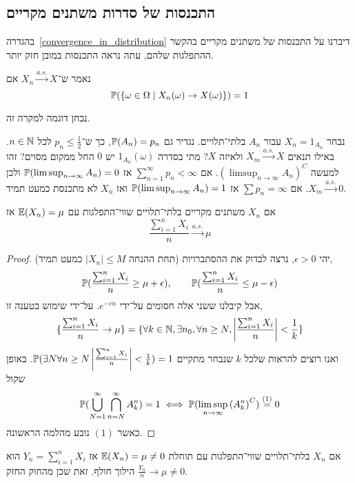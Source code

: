 \subsection{התכנסות של סדרות משתנים מקריים}\label{almost_surely_convergence}
בהגדרה\ \ref{convergence_in_distribution} דיברנו על התכנסות של משתנים מקריים בהקשר ההתפלגות שלהם, עתה נראה התכנסות במובן חזק יותר.
\begin{definition}
	נאמר ש־$X_n \xrightarrow{a.s.} X$ אם
	\[
		\mathbb{P}(\{ \omega \in \Omega \mid X_n(\omega) \to X(\omega) \}) = 1
	\]
\end{definition}
נבחן דוגמה למקרה זה.
\begin{example}
	נבחר $X_n = 1_{A_n}$ עבור $A_n$ בלתי־תלויים.
	נגדיר גם $\mathbb{P}(A_n) = p_n$, כך ש־$p_n \le \frac{1}{2}$ לכל $n \in \mathbb{N}$.
	באילו תנאים $X_m \xrightarrow{a.s.} X$ ולאיזה $X$?
	מתי בסדרה $1_{A_n}(\omega)$ יש $0$ החל ממקום מסוים?
	זהו למעשה ${(\limsup_{n \to \infty} A_n)}^C$.
	אם $\sum_{n = 1}^{\infty} p_n < \infty$ אז $\mathbb{P}(\limsup_{n \to \infty} A_n) = 0$ ולכן $X_m \xrightarrow{a.s.} 0$.
	אם $\sum p_n = \infty$ אז $\mathbb{P}(\limsup_{n \to \infty} A_n) = 1$ ואז $X_n$ לא מתכנסת כמעט תמיד.
\end{example}
\begin{theorem}
	אם $X_n$ משתנים מקריים בלתי־תלויים שווי־התפלגות עם $\mathbb{E}(X_n) = \mu$ אז
	\[
		\frac{\sum_{i = 1}^{n} X_i}{n} \xrightarrow{a.s.} \mu
	\]
\end{theorem}
\begin{proof} (תחת ההנחה $|X_n| \le M$ כמעט תמיד)
	יהי $\epsilon > 0$,
	נרצה לבדוק את ההסתברויות,
	\[
		\mathbb{P}(\frac{\sum_{i = 1}^{n} X_i}{n} \ge \mu + \epsilon),
		\qquad
		\mathbb{P}(\frac{\sum_{i = 1}^{n} X_i}{n} \le \mu - \epsilon)
	\]
	אבל קיבלנו ששני אלה חסומים על־ידי $e^{-cn}$.
	על־ידי שימוש בטענה זו,
	\[
		\{ \frac{\sum_{i = 1}^{n} X_i}{n} \to \mu \}
		= \{ \forall k \in \mathbb{N}, \exists n_0, \forall n \ge N, \left\lvert \frac{\sum_{i = 1}^{n} X_i}{n} \right\rvert < \frac{1}{k} \}
	\]
	ואנו רוצים להראות שלכל $k$ שנבחר מתקיים $\mathbb{P}(\exists N \forall n \ge N \left\lvert \frac{\sum_{i = 1}^{n} X_i}{n} \right\rvert < \frac{1}{k}) = 1$.
	באופן שקול
	\[
		\mathbb{P}(\bigcup_{N = 1}^\infty \bigcap_{n = N}^\infty A_k^n) = 1
		\iff
		\mathbb{P}(\limsup_{n \to \infty} {(A_k^n)}^C) \overset{(1)}{=} 0
	\]
	כאשר $(1)$ נובע מהלמה הראשונה.
\end{proof}
\begin{conclusion}
	אם $X_n$ בלתי־תלויים שווי־התפלגות עם תוחלת $\mathbb{E}(X_n) = \mu \ne 0$ אז $Y_n = \sum_{i = 1}^{n} X_i$ הוא הילוך חולף.
	זאת שכן מהחוק החזק $\frac{Y_n}{n} \to \mu \ne 0$.
\end{conclusion}

